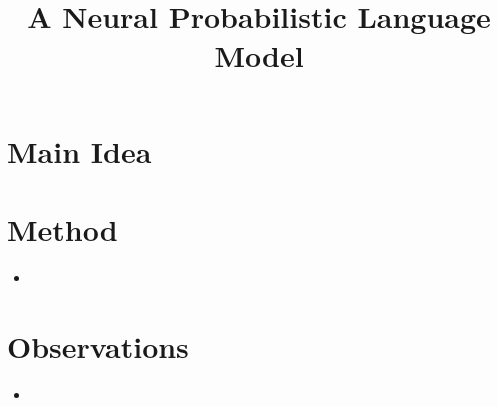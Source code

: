 \documentclass[12pt]{scrartcl}
\begin{document}
\title{A Neural Probabilistic Language Model}
\author{}
\date{}
\maketitle

\section{Main Idea}

\section{Method}
  \begin{itemize}
    \item 
  \end{itemize}

\section{Observations}
  \begin{itemize}
    \item 
  \end{itemize}



\end{document}
